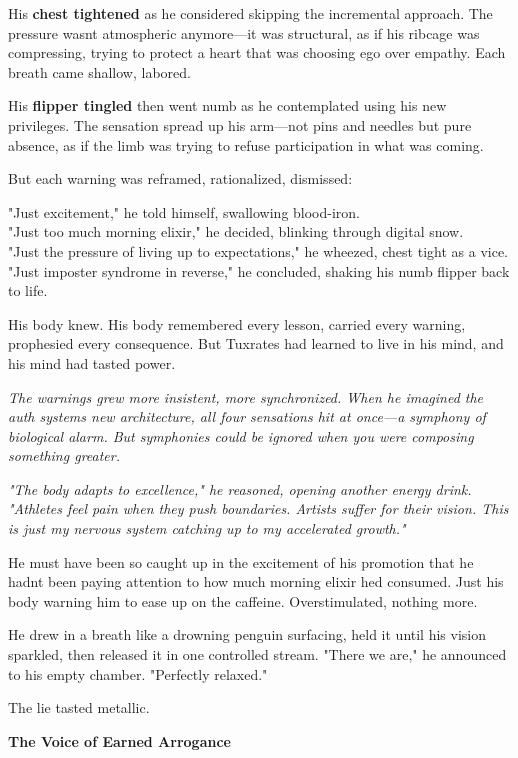 His \textbf{chest tightened} as he considered skipping the incremental approach. The pressure wasn\textquotesingle t atmospheric anymore---it was structural, as if his ribcage was compressing, trying to protect a heart that was choosing ego over empathy. Each breath came shallow, labored.

His \textbf{flipper tingled} then went numb as he contemplated using his new privileges. The sensation spread up his arm---not pins and needles but pure absence, as if the limb was trying to refuse participation in what was coming.

But each warning was reframed, rationalized, dismissed:

"Just excitement," he told himself, swallowing blood-iron.\\
"Just too much morning elixir," he decided, blinking through digital snow.\\
"Just the pressure of living up to expectations," he wheezed, chest tight as a vice.\\
"Just imposter syndrome in reverse," he concluded, shaking his numb flipper back to life.

His body knew. His body remembered every lesson, carried every warning, prophesied every consequence. But Tuxrates had learned to live in his mind, and his mind had tasted power.

\emph{The warnings grew more insistent, more synchronized. When he imagined the auth system\textquotesingle s new architecture, all four sensations hit at once---a symphony of biological alarm. But symphonies could be ignored when you were composing something greater.}

\emph{"The body adapts to excellence," he reasoned, opening another energy drink. "Athletes feel pain when they push boundaries. Artists suffer for their vision. This is just my nervous system catching up to my accelerated growth."}

He must have been so caught up in the excitement of his promotion that he hadn\textquotesingle t been paying attention to how much morning elixir he\textquotesingle d consumed. Just his body warning him to ease up on the caffeine. Overstimulated, nothing more.

He drew in a breath like a drowning penguin surfacing, held it until his vision sparkled, then released it in one controlled stream. "There we are," he announced to his empty chamber. "Perfectly relaxed."

The lie tasted metallic.

\textbf{The Voice of Earned Arrogance}

